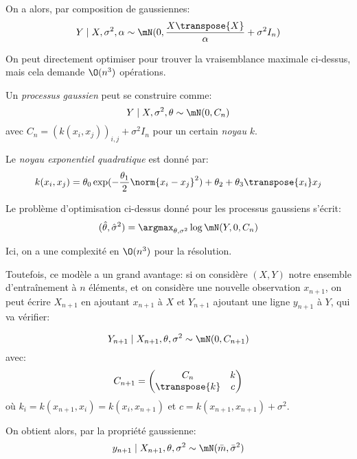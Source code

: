\documentclass[info, math, french]{mpb-cours}
\def\that{\hat{\theta}}
\def\define#1{\emph{\textcolor{vulm}{#1}}}
\begin{document}
\begin{proposition}
	On a alors, par composition de gaussiennes:
	\begin{equation*}
		Y \mid X, \sigma^{2}, \alpha \sim \mN(0, \frac{X\transpose{X}}{\alpha} + \sigma^{2}I_{n})
	\end{equation*}
\end{proposition}
On peut directement optimiser pour trouver la vraisemblance maximale ci-dessus, mais cela demande $\O(n^{3})$ opérations.


\begin{definition}
	Un \define{processus gaussien} peut se construire comme:
	\begin{equation*}
		Y\mid X, \sigma^{2}, \theta \sim \mN(0, C_{n})
	\end{equation*}
	avec $C_{n} = \left(k\left(x_{i}, x_{j}\right)\right)_{i, j} + \sigma^{2}I_{n}$ pour un certain \define{noyau} $k$.
\end{definition}

\begin{definition}
	Le \define{noyau exponentiel quadratique} est donné par:
	\begin{equation*}
		k(x_{i}, x_{j}) = \theta_{0}\exp(-\frac{\theta_{1}}{2}\norm{x_{i} - x_{j}}^{2}) + \theta_{2} + \theta_{3} \transpose{x_{i}}x_{j}
	\end{equation*}
\end{definition}

\begin{proposition}
	Le problème d'optimisation ci-dessus donné pour les processus gaussiens s'écrit:
	\begin{equation*}
		(\that, \hat{\sigma}^{2}) = \argmax_{\theta, \sigma^{2}}\log \mN(Y, 0, C_{n})
	\end{equation*}
\end{proposition}
Ici, on a une complexité en $\O(n^{3})$ pour la résolution.

Toutefois, ce modèle a un grand avantage: si on considère $(X, Y)$ notre ensemble d'entraînement à $n$ éléments,
et on considère une nouvelle observation $x_{n + 1}$, on peut écrire $X_{n + 1}$ en ajoutant $x_{n + 1}$ à $X$ et $Y_{n + 1}$ ajoutant une ligne $y_{n + 1}$ à $Y$, qui va vérifier:

\begin{equation*}
	Y_{n + 1} \mid X_{n + 1}, \theta, \sigma^{2} \sim \mN(0, C_{n + 1})
\end{equation*}
avec:
\begin{equation*}
	C_{n + 1} =
	\begin{pmatrix}
		C_{n}         & k \\
		\transpose{k} & c
	\end{pmatrix}
\end{equation*}
où $k_{i} = k(x_{n + 1}, x_{i}) = k(x_{i}, x_{n + 1})$ et $c = k(x_{n + 1}, x_{n + 1}) + \sigma^{2}$.
\begin{proposition}
	On obtient alors, par la propriété gaussienne:
	\begin{equation*}
		y_{n + 1} \mid X_{n + 1}, \theta, \sigma^{2} \sim \mN(\bar{m}, \bar{\sigma}^{2})
	\end{equation*}
\end{proposition}
\end{document}
